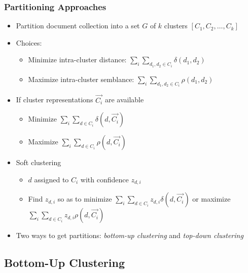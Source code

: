 \documentclass{beamer}
\begin{document}
\begin{frame}
  \frametitle{Partitioning Approaches}

  \begin{itemize}
  \item Partition document collection into a set $G$ of $k$ clusters $[C_1, C_2, \dotsc,
    C_k]$
  \item Choices:
    \begin{itemize}
    \item Minimize intra-cluster distance: $\sum_i\sum_{d_1,d_2\in
        C_i}\delta(d_1,d_2)$
    \item Maximize intra-cluster semblance: $\sum_i\sum_{d_1,d_2\in
        C_i}\rho(d_1,d_2)$
    \end{itemize}
  \item If cluster representations $\vec{C_i}$ are available
    \begin{itemize}
    \item Minimize $\sum_i\sum_{d\in C_i}\delta(d,\vec{C_i})$
    \item Maximize $\sum_i\sum_{d\in C_i}\rho(d,\vec{C_i})$
    \end{itemize}
  \item Soft clustering
    \begin{itemize}
    \item $d$ assigned to $C_i$ with confidence $z_{d,i}$
    \item Find $z_{d,i}$ so as to minimize $\sum_i\sum_{d\in
        C_i}z_{d,i}\delta(d,\vec{C_i})$ or maximize $\sum_i\sum_{d\in
        C_i}z_{d,i}\rho(d,\vec{C_i})$
    \end{itemize}
  \item Two ways to get partitions: \emph{bottom-up clustering} and
    \emph{top-down clustering}
  \end{itemize}

\end{frame}


\subsection{Bottom-Up Clustering}
\end{document}
